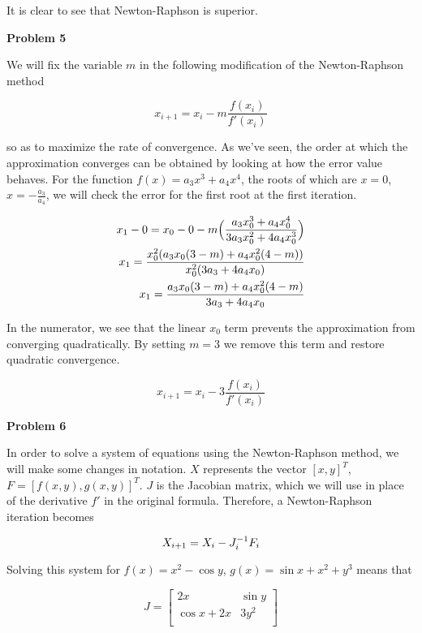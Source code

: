 \documentclass[a4paper,12pt]{article}
\begin{document}
It is clear to see that Newton-Raphson is superior. 
\bigskip

{\bf Problem  5}
\smallskip

We will fix the variable $m$ in the following modification of the Newton-Raphson method

\begin{equation*}
x_{i+1}=x_i-m \frac{f(x_i)}{f'(x_i)}
\end{equation*}

so as to maximize the rate of convergence. As we've seen, the order at which the approximation converges can be obtained by looking at how the error value behaves. For the function $f(x)=a_3x^3+a_4x^4$, the roots of which are $x=0$, $x=-\frac{a_3}{a_4}$, we will check the error for the first root at the first iteration. 

\begin{eqnarray*}
x_1-0=x_0-0-m \Big{(} \frac{a_3x_0^3+a_4x_0^4}{3a_3x_0^2+4a_4x_0^3} \Big{)} \\
x_1=\frac{x_0^2(a_3x_0(3-m)+a_4x_0^2(4-m))}{x_0^2(3a_3+4a_4x_0)}  \\
x_1= \frac{a_3x_0(3-m)+a_4x_0^2(4-m)}{3a_3+4a_4x_0}  \\
\end{eqnarray*}

In the numerator, we see that the linear $x_0$ term prevents the approximation from converging quadratically. By setting $m=3$ we remove this term and restore quadratic convergence. 

\begin{equation*}
x_{i+1}=x_i-3 \frac{f(x_i)}{f'(x_i)}
\end{equation*}

{\bf Problem 6}
\smallskip

In order to solve a system of equations using the Newton-Raphson method, we will make some changes in notation. $X$ represents the vector $[x,y]^T$, $F=[f(x,y),g(x,y)]^T$. $J$ is the Jacobian matrix, which we will use in place of the derivative $f'$ in the original formula. Therefore, a Newton-Raphson iteration becomes

\begin{equation*}
X_{i+1}=X_i-J_i^{-1}F_i \\
\end{equation*}

Solving this system for $f(x)=x^2-\cos{y}$, $g(x)=\sin{x}+x^2+y^3$ means that

\begin{equation*}
J=
 \begin{bmatrix}
	2x & \sin{y}  \\[0.2em]
	\cos{x}+2x & 3y^2  \\[0.2em]
     \end{bmatrix}
\end{equation*}
\end{document}
